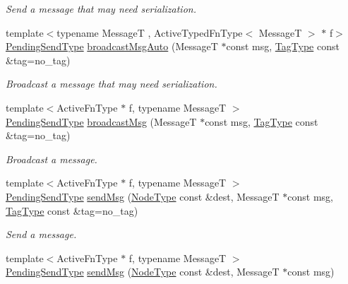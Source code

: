 \begin{DoxyCompactItemize}
\begin{DoxyCompactList}\small\item\em Send a message that may need serialization. \end{DoxyCompactList}\item 
{\footnotesize template$<$typename MessageT , Active\+Typed\+Fn\+Type$<$ Message\+T $>$ $\ast$ f$>$ }\\\hyperlink{structvt_1_1messaging_1_1_active_messenger_a3626a6ca76d8ad4ec7c3b47a2c70d3a8}{Pending\+Send\+Type} \hyperlink{group__typesafehan_ga52ece14c329a6e27b3749fd93d60beaa}{broadcast\+Msg\+Auto} (MessageT $\ast$const msg, \hyperlink{namespacevt_a84ab281dae04a52a4b243d6bf62d0e52}{Tag\+Type} const \&tag=no\+\_\+tag)
\begin{DoxyCompactList}\small\item\em Broadcast a message that may need serialization. \end{DoxyCompactList}\item 
{\footnotesize template$<$Active\+Fn\+Type $\ast$ f, typename MessageT $>$ }\\\hyperlink{structvt_1_1messaging_1_1_active_messenger_a3626a6ca76d8ad4ec7c3b47a2c70d3a8}{Pending\+Send\+Type} \hyperlink{group__basicsend_gaa5b764aaa06e9c9141b04f6d8a420d43}{broadcast\+Msg} (MessageT $\ast$const msg, \hyperlink{namespacevt_a84ab281dae04a52a4b243d6bf62d0e52}{Tag\+Type} const \&tag=no\+\_\+tag)
\begin{DoxyCompactList}\small\item\em Broadcast a message. \end{DoxyCompactList}\item 
{\footnotesize template$<$Active\+Fn\+Type $\ast$ f, typename MessageT $>$ }\\\hyperlink{structvt_1_1messaging_1_1_active_messenger_a3626a6ca76d8ad4ec7c3b47a2c70d3a8}{Pending\+Send\+Type} \hyperlink{group__basicsend_ga13e2d0b763ed5baac91fb86472d39f5e}{send\+Msg} (\hyperlink{namespacevt_a866da9d0efc19c0a1ce79e9e492f47e2}{Node\+Type} const \&dest, MessageT $\ast$const msg, \hyperlink{namespacevt_a84ab281dae04a52a4b243d6bf62d0e52}{Tag\+Type} const \&tag=no\+\_\+tag)
\begin{DoxyCompactList}\small\item\em Send a message. \end{DoxyCompactList}\item 
{\footnotesize template$<$Active\+Fn\+Type $\ast$ f, typename MessageT $>$ }\\\hyperlink{structvt_1_1messaging_1_1_active_messenger_a3626a6ca76d8ad4ec7c3b47a2c70d3a8}{Pending\+Send\+Type} \hyperlink{group__basicsend_ga6fe7fc2545ccc779bb6e35f7c0032691}{send\+Msg} (\hyperlink{namespacevt_a866da9d0efc19c0a1ce79e9e492f47e2}{Node\+Type} const \&dest, MessageT $\ast$const msg)

\end{DoxyCompactItemize}
